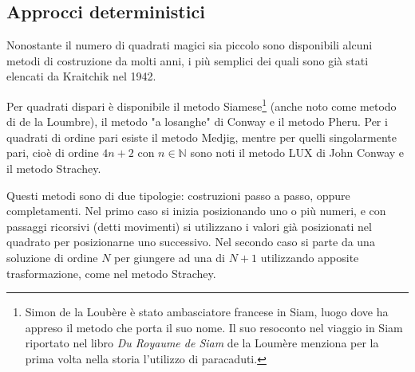 \documentclass[italian,twoside,twocolumn]{article}
\begin{document}
\subsection{Approcci deterministici}
Nonostante il numero di quadrati magici sia piccolo  sono disponibili alcuni metodi di costruzione da molti anni, i più semplici dei quali sono già stati elencati da Kraitchik \cite{Krai:1942} nel 1942.

Per quadrati dispari è disponibile il metodo Siamese\footnote{Simon de la Loubère è stato ambasciatore francese in Siam, luogo dove ha appreso il metodo che porta il suo nome. Il suo resoconto nel viaggio in Siam riportato nel libro \emph{Du Royaume de Siam} de la Loumère menziona per la prima volta nella storia l'utilizzo di paracaduti.} (anche noto come metodo di de la Loumbre), il metodo "a losanghe" di Conway e il metodo Pheru.
Per i quadrati di ordine pari esiste il metodo Medjig, mentre per quelli singolarmente pari, cioè di ordine $ 4n + 2 \text{ con } n \in \mathbb{N}$ sono noti il metodo LUX di John Conway e il metodo Strachey.

Questi metodi sono di due tipologie: costruzioni passo a passo, oppure completamenti. Nel primo caso si inizia posizionando uno o più numeri, e con passaggi ricorsivi (detti movimenti) si utilizzano i valori già posizionati nel quadrato per posizionarne uno successivo. Nel secondo caso si parte da una soluzione di ordine $ N $ per giungere ad una di $ N + 1 $ utilizzando apposite trasformazione, come nel metodo Strachey.
\end{document}
